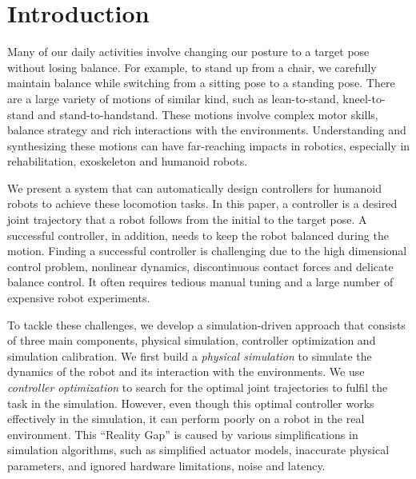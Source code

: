 \section{Introduction}
Many of our daily activities involve changing our posture to a target pose without losing balance. For example, to stand up from a chair, we carefully maintain balance while switching from a sitting pose to a standing pose. There are a large variety of motions of similar kind, such as lean-to-stand, kneel-to-stand and stand-to-handstand. These motions involve complex motor skills, balance strategy and rich interactions with the environments. Understanding and synthesizing these motions can have far-reaching impacts in robotics, especially in rehabilitation, exoskeleton and humanoid robots.

We present a system that can automatically design controllers for humanoid robots to achieve these locomotion tasks. In this paper, a controller is a desired joint trajectory that a robot follows from the initial to the target pose. A successful controller, in addition, needs to keep the robot balanced during the motion. Finding a successful controller is challenging due to the high dimensional control problem, nonlinear dynamics, discontinuous contact forces and delicate balance control. It often requires tedious manual tuning and a large number of expensive robot experiments. 

To tackle these challenges, we develop a simulation-driven approach that consists of three main components, physical simulation, controller optimization and simulation calibration. We first build a \emph{physical simulation} to simulate the dynamics of the robot and its interaction with the environments. We use \emph{controller optimization} to search for the optimal joint trajectories to fulfil the task in the simulation. However, even though this optimal controller works effectively in the simulation, it can perform poorly on a robot in the real environment. This ``Reality Gap'' \cite{Jakobi95} is caused by various simplifications in simulation algorithms, such as simplified actuator models, inaccurate physical parameters, and ignored hardware limitations, noise and latency. 

